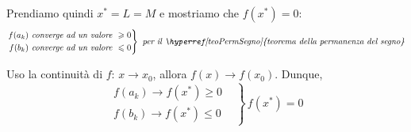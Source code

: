 \documentclass[../../dimostrazioni]{subfiles}
\begin{document}
            Prendiamo quindi \(x^* = L = M\) e mostriamo che \(f(x^*) = 0\):
            \[
                \left.
                \begin{aligned}
                    f(a_k) \text{\emph{ converge ad un valore }} \geqslant 0\\
                    f(b_k) \text{\emph{ converge ad un valore }} \leqslant 0
                \end{aligned}
                \right\}
                \text{\emph{ per il \hyperref[teoPermSegno]{teorema della permanenza del segno}}}
            \]

            Uso la continuità di \(f\): \(x \to x_0\), allora \(f(x) \to f(x_0)\). Dunque,
            \[
                \left.
                \begin{aligned}
                    f(a_k) \to f(x^*) \geqslant 0&\\
                    f(b_k) \to f(x^*) \leqslant 0&
                \end{aligned}
                \right\} \, f(x^*) = 0
            \]
        
\end{document}
